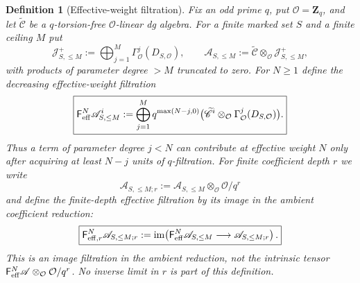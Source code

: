 \documentclass[11pt]{article}
\newtheorem{definition}[theorem]{Definition}
\theoremstyle{remark}
\newcommand{\Z}{\mathbf Z}
\begin{document}
\begin{definition}[Effective-weight filtration]\label{P1C-def:effective-weight-relation-module}
Fix an odd prime $q$, put $\mathcal O=\Z_q$, and let $\widetilde{\mathscr C}$ be a
$q$-torsion-free $\mathcal O$-linear dg algebra.  For a finite marked set $S$ and a finite ceiling
$M$ put
\[
 \mathscr J^{+}_{S,\le M}
 :=\bigoplus_{j=1}^{M}\Gamma^j_{\mathcal O}(D_{S,\mathcal O}),
 \qquad
 \mathscr A_{S,\le M}:=
 \widetilde{\mathscr C}\otimes_{\mathcal O}\mathscr J^{+}_{S,\le M},
\]
with products of parameter degree $>M$ truncated to zero.  For $N\ge1$ define the decreasing
\emph{effective-weight filtration}
\begin{equation}\label{P1C-eq:effective-weight-filtration}
 \boxed{
 \mathsf F_{\rm eff}^{N}\mathscr A^i_{S,\le M}
 :=\bigoplus_{j=1}^{M}
 q^{\max(N-j,0)}
 \bigl(\widetilde{\mathscr C}^{i}\otimes_{\mathcal O}
       \Gamma^j_{\mathcal O}(D_{S,\mathcal O})\bigr).}
\end{equation}
Thus a term of parameter degree $j<N$ can contribute at effective weight $N$ only after acquiring at
least $N-j$ units of $q$-filtration.  For finite coefficient depth $r$ we write
\[
 \mathscr A_{S,\le M;r}
 :=\mathscr A_{S,\le M}\otimes_{\mathcal O}\mathcal O/q^r
\]
and define the finite-depth effective filtration by its image in the ambient
coefficient reduction:
\begin{equation}\label{P1C-eq:finite-depth-effective-image-filtration}
 \boxed{
 \mathsf F_{{\rm eff},r}^{N}\mathscr A_{S,\le M;r}
 :=\operatorname{im}\!\left(
 \mathsf F_{\rm eff}^{N}\mathscr A_{S,\le M}
 \longrightarrow \mathscr A_{S,\le M;r}
 \right).}
\end{equation}
This is an image filtration in the ambient reduction, not the intrinsic tensor
$\mathsf F_{\rm eff}^{N}\mathscr A\otimes_{\mathcal O}\mathcal O/q^r$.
No inverse limit in $r$ is part of this definition.
\end{definition}
\end{document}
